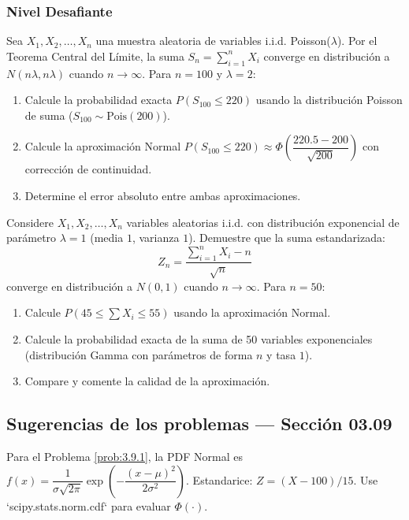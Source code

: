 \subsubsection*{Nivel Desafiante}

\begin{problema}
	\label{prob:3.9.9}
	Sea $X_{1}, X_{2}, \dots, X_{n}$ una muestra aleatoria de variables i.i.d. Poisson($\lambda$). Por el Teorema Central del Límite, la suma $S_{n} = \sum_{i=1}^{n} X_{i}$ converge en distribución a $N(n\lambda, n\lambda)$ cuando $n \to \infty$. Para $n = 100$ y $\lambda = 2$:
	\begin{enumerate}
		\item Calcule la probabilidad exacta $P(S_{100} \le 220)$ usando la distribución Poisson de suma ($S_{100} \sim \text{Pois}(200)$).
		\item Calcule la aproximación Normal $P(S_{100} \le 220) \approx \Phi\left(\dfrac{220.5 - 200}{\sqrt{200}}\right)$ con corrección de continuidad.
		\item Determine el error absoluto entre ambas aproximaciones.
	\end{enumerate}
\end{problema}

\begin{problema}
	\label{prob:3.9.10}
	Considere $X_{1}, X_{2}, \dots, X_{n}$ variables aleatorias i.i.d. con distribución exponencial de parámetro $\lambda = 1$ (media $1$, varianza $1$). Demuestre que la suma estandarizada:
	$$Z_{n} = \dfrac{\sum_{i=1}^{n} X_{i} - n}{\sqrt{n}}$$
	converge en distribución a $N(0, 1)$ cuando $n \to \infty$. Para $n = 50$:
	\begin{enumerate}
		\item Calcule $P(45 \le \sum X_{i} \le 55)$ usando la aproximación Normal.
		\item Calcule la probabilidad exacta de la suma de 50 variables exponenciales (distribución Gamma con parámetros de forma $n$ y tasa $1$).
		\item Compare y comente la calidad de la aproximación.
	\end{enumerate}
\end{problema}

\subsection*{Sugerencias de los problemas --- Sección 03.09}

\begin{sugerencia}
	\label{sug:3.9.1}
	Para el Problema \ref{prob:3.9.1}, la PDF Normal es $f(x) = \dfrac{1}{\sigma\sqrt{2\pi}} \exp\left(-\dfrac{(x-\mu)^{2}}{2\sigma^{2}}\right)$. Estandarice: $Z = (X - 100)/15$. Use `scipy.stats.norm.cdf` para evaluar $\Phi(\cdot)$.
\end{sugerencia}

